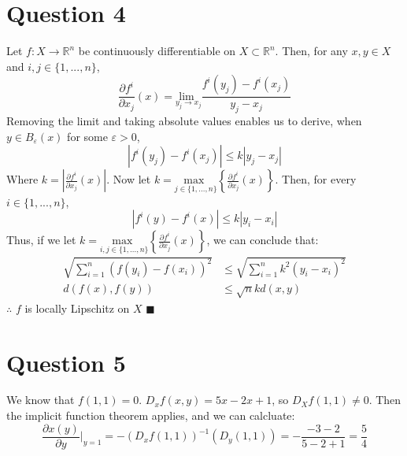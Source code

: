 \documentclass{article}
\newcommand{\R}{\mathbb{R}}
\newcommand{\usmax}[1]{\underset{#1}{\text{max }}}
\newcommand{\at}[2][]{#1|_{#2}}
\begin{document}
\section*{Question 4}
Let $f:X\rightarrow\R^n$ be continuously differentiable on $X\subset\R^n$. Then, for any $x,y\in X$ and $i,j\in\{1,...,n\}$,
\[
	\frac{\partial f^i}{\partial x_j}(x) = \underset{y_j\rightarrow x_j}{\text{lim }}\frac{f^i(y_j)-f^i(x_j)}{y_j-x_j}
\]
Removing the limit and taking absolute values enables us to derive, when $y\in B_\varepsilon(x)$ for some $\varepsilon>0$,
\[
	|f^i(y_j)-f^i(x_j)| \leq k|y_j-x_j|
\]
Where $k=|\frac{\partial f^i}{\partial x_j}(x)|$. Now let $k=\usmax{j\in\{1,...,n\}}\left\{\frac{\partial f^i}{\partial x_j}(x)\right\}$. Then, for every $i\in\{1,...,n\}$,
\[
	|f^i(y)-f^i(x)| \leq k|y_i-x_i|
\]
Thus, if we let $k=\usmax{i,j\in\{1,...,n\}}\left\{\frac{\partial f^i}{\partial x_j}(x)\right\}$, we can conclude that:
\begin{align*}
	\sqrt{\sum_{i=1}^n\left(f(y_i)-f(x_i)\right)^2} &\leq \sqrt{\sum_{i=1}^nk^2\left(y_i-x_i\right)^2} \\
	d(f(x),f(y)) &\leq \sqrt{n}kd(x,y)
\end{align*}
$\therefore$ $f$ is locally Lipschitz on $X$ $\blacksquare$


\section*{Question 5}
We know that $f(1,1)=0$. $D_xf(x,y) = 5x-2x+1$, so $D_Xf(1,1) \neq 0$. Then the implicit function theorem applies, and we can calcluate:
\[
	\frac{\partial x(y)}{\partial y}\at[\big]{y=1} = -(D_xf(1,1))^{-1}(D_y(1,1)) = -\frac{-3-2}{5-2+1} = \frac{5}{4}
\]

\end{document}
